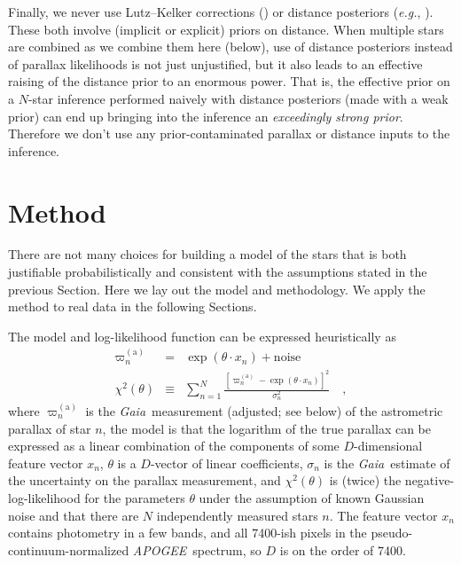 \documentclass[modern]{aastex62}
\newcommand{\sectionname}{Section}
\newcommand{\foreign}[1]{\textsl{#1}}
\newcommand{\eg}{\foreign{e.g.}}
\newcommand{\acronym}[1]{{\small{#1}}}
\newcommand{\project}[1]{\textsl{#1}}
\newcommand{\apogee}{\project{\acronym{APOGEE}}}
\newcommand{\gaia}{\project{Gaia}}
\newcommand{\gparallax}{\varpi^{(\mathrm{a})}}
\begin{document}
Finally, we never use Lutz--Kelker corrections (\citealt{lk}) or distance
posteriors (\eg, \citealt{calj}). These both involve (implicit or explicit) priors on 
distance.
When multiple stars are combined as we combine them here (below),
use of distance posteriors instead of parallax likelihoods is not just
unjustified, but it also leads to an
effective raising of the distance prior to an enormous power.
That is, the effective prior on a $N$-star inference performed naively
with distance posteriors (made with a weak prior) can end up
bringing into the inference an \emph{exceedingly
strong prior}.
Therefore we don't use any prior-contaminated parallax or distance
inputs to the inference.

\section{Method}

There are not many choices
for building a model of the stars that is both justifiable probabilistically
and consistent with the assumptions stated in the previous \sectionname.
Here we lay out the model and methodology.
We apply the method to real data in the following {\sectionname s}.

The model and log-likelihood function can be expressed heuristically as
\begin{eqnarray}
\gparallax_n &=& \exp(\theta\cdot x_n) + \mbox{noise}
\\
\chi^2(\theta) &\equiv& \sum_{n=1}^N \frac{[\gparallax_n - \exp(\theta\cdot x_n)]^2}{\sigma_n^2}
\quad ,
\end{eqnarray}
where
$\gparallax_n$ is the \gaia\ measurement (adjusted; see below) of the astrometric parallax of star $n$,
the model is that the logarithm of the true parallax
can be expressed as a linear combination of the components
of some $D$-dimensional feature vector $x_n$,
$\theta$ is a $D$-vector of linear coefficients,
$\sigma_n$ is the \gaia\ estimate of the uncertainty on the parallax measurement,
and $\chi^2(\theta)$ is (twice) the negative-log-likelihood for the parameters $\theta$
under the assumption of known Gaussian noise and
that there are $N$ independently measured stars $n$.
The feature vector $x_n$ contains photometry in a few bands, and all 7400-ish pixels
in the pseudo-continuum-normalized \apogee\ spectrum, so $D$ is on the order of 7400.
\end{document}
